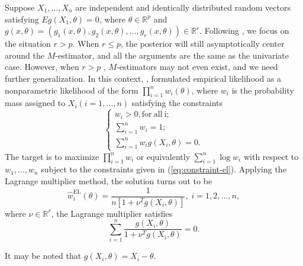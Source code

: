Suppose $X_{1},\ldots,X_{n}$ are independent and identically distributed
random vectors satisfying $Eg\left(X_{1},\theta\right)=0$, where
$\theta\in\mathbb{R}^{p}$ and $g\left(x,\theta\right)=\left(g_{1}\left(x,\theta\right),g_{2}\left(x,\theta\right),\ldots,g_{r}\left(x,\theta\right)\right)\in\mathbb{R}^{r}$.
Following \citet{qin1994empirical}, we focus on the situation $r>p$.
When $r\le p$, the posterior will still asymptotically center around
the $M$-estimator, and all the arguments are the same as the univariate case.
However, when $r>p$ , $M$-estimators may not even exist, and we need further
generalization. In this context, \citet{owen1988empirical}, formulated
empirical likelihood as a nonparametric likelihood of the form $\prod_{i=1}^{n}w_{i}\left(\theta\right)$,
where $w_{i}$ is the probability mass assigned to $X_{i}\left(i=1,\ldots,n\right)$
satisfying the constraints 
\begin{equation}
\begin{cases}
w_{i}>0,\mathrm{for\: all\: i;}\\
\sum_{i=1}^{n}w_{i}=1;\\
\sum_{i=1}^{n}w_{i}g\left(X_{i},\theta\right)=0.
\end{cases}\label{eq:constraint-el}
\end{equation}
The target is to maximize $\prod_{i=1}^{n}w_{i}$ or equivalently
$\sum_{i=1}^{n}\log w_{i}$ with respect to $w_{1},\ldots,w_{n}$
subject to the constraints given in (\ref{eq:constraint-el}). Applying
the Lagrange multiplier method, the solution turns out to be 
\begin{equation}
\hat{w}_{i}^{\mathrm{EL}}\left(\theta\right)=\frac{1}{n\left[1+\nu^{T}g\left(X_{i},\theta\right)\right]},\; i=1,2,\ldots,n,\label{eq:sol-emp-lik}
\end{equation}
where $\nu\in\mathbb{R}^{r}$, the Lagrange multiplier satisfies 
\begin{equation}
\sum_{i=1}^{n}\frac{g\left(X_{i},\theta\right)}{1+\nu^{T}g\left(X_{i},\theta\right)}=0.\label{eq:lambda-eq}
\end{equation}


It may be noted that \citet{fang2005expected,fang2006empirical} $g\left(X_{i},\theta\right)=X_{i}-\theta$. 

